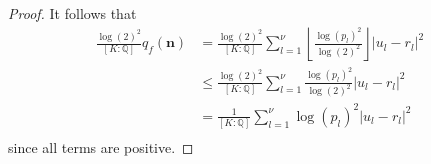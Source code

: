 \begin{proof}
It follows that
\begin{align*}
\frac{\log(2)^2}{[K:\mathbb{Q}]}q_f(\mathbf{n}) 
	& = \frac{\log(2)^2}{[K:\mathbb{Q}]}\sum_{l = 1}^{\nu} \left\lfloor\frac{\log(p_l)^2}{\log(2)^2}\right\rfloor|u_l -r_l|^2 \\
	& \leq \frac{\log(2)^2}{[K:\mathbb{Q}]}\sum_{l = 1}^{\nu}\frac{\log(p_l)^2}{\log(2)^2}|u_l -r_l|^2 \\
	& = \frac{1}{[K:\mathbb{Q}]}\sum_{l = 1}^{\nu}\log(p_l)^2|u_l -r_l|^2 \\
\end{align*}
since all terms are positive. 


\end{proof}
